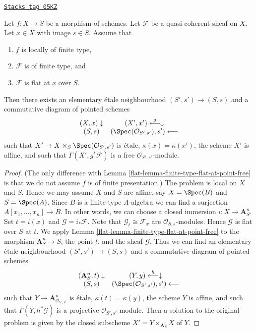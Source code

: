 \begin{lemma}
\label{flat-lemma-finite-type-flat-at-point-free-variant}
\href{https://stacks.math.columbia.edu/tag/05KZ}{\texttt{Stacks tag 05KZ}}

Let $f : X \to S$ be a morphism of schemes.
Let $\mathcal{F}$ be a quasi-coherent sheaf on $X$.
Let $x \in X$ with image $s \in S$.
Assume that
\begin{enumerate}
\item $f$ is locally of finite type,
\item $\mathcal{F}$ is of finite type, and
\item $\mathcal{F}$ is flat at $x$ over $S$.
\end{enumerate}
Then there exists an elementary \'etale neighbourhood $(S', s') \to (S, s)$
and a commutative diagram of pointed schemes
$$
\begin{array}{cc}(X, x) \downarrow & (X', x') \overset{g}{\longleftarrow}\downarrow \\ (S, s) & (\Spec(\mathcal{O}_{S', s'}), s') \longleftarrow\end{array}
$$
such that $X' \to X \times_S \Spec(\mathcal{O}_{S', s'})$
is \'etale, $\kappa(x) = \kappa(x')$, the scheme $X'$ is
affine, and such that $\Gamma(X', g^*\mathcal{F})$ is a free
$\mathcal{O}_{S', s'}$-module.
\end{lemma}

\begin{proof}

(The only difference with
Lemma \ref{flat-lemma-finite-type-flat-at-point-free}
is that we do not assume $f$ is of finite presentation.)
The problem is local on $X$ and $S$. Hence we may assume $X$ and
$S$ are affine, say $X = \Spec(B)$ and $S = \Spec(A)$.
Since $B$ is a finite type $A$-algebra we can find a surjection
$A[x_1, \ldots, x_n] \to B$. In other words, we can choose a closed
immersion $i : X \to \mathbf{A}^n_S$. Set $t = i(x)$ and
$\mathcal{G} = i_*\mathcal{F}$. Note that $\mathcal{G}_t \cong \mathcal{F}_x$
are $\mathcal{O}_{S, s}$-modules. Hence $\mathcal{G}$ is flat over $S$ at $t$.
We apply
Lemma \ref{flat-lemma-finite-type-flat-at-point-free}
to the morphism $\mathbf{A}^n_S \to S$, the point $t$, and the
sheaf $\mathcal{G}$. Thus we can find an
elementary \'etale neighbourhood $(S', s') \to (S, s)$
and a commutative diagram of pointed schemes
$$
\begin{array}{cc}(\mathbf{A}^n_S, t) \downarrow & (Y, y) \overset{h}{\longleftarrow}\downarrow \\ (S, s) & (\Spec(\mathcal{O}_{S', s'}), s') \longleftarrow\end{array}
$$
such that $Y \to \mathbf{A}^n_{\mathcal{O}_{S', s'}}$
is \'etale, $\kappa(t) = \kappa(y)$, the scheme $Y$ is
affine, and such that $\Gamma(Y, h^*\mathcal{G})$ is a projective
$\mathcal{O}_{S', s'}$-module. Then a solution to the original
problem is given by the closed subscheme
$X' = Y \times_{\mathbf{A}^n_S} X$ of $Y$.
\end{proof}

